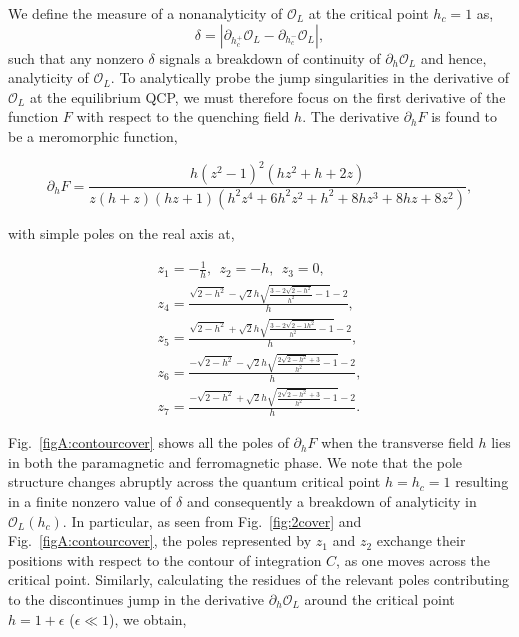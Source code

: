 \documentclass[aps,prx,twocolumn]{revtex4-2}
\begin{document}
{{ We define the measure of a nonanalyticity of $\mathcal{O}_L$ at the critical point $h_c=1$ as,
\begin{equation}\label{eq_a:delta}
	\delta=\left|\partial_{h_c^+}\mathcal{O}_L-\partial_{h_c^-}\mathcal{O}_L\right|,
\end{equation}
such that any nonzero $\delta$ signals a breakdown of continuity of $\partial_h\mathcal{O}_L$ and hence, analyticity of $\mathcal{O}_L$. To analytically probe  the jump singularities in the derivative of $\mathcal{O}_L$ at the equilibrium QCP, we must therefore focus on the first derivative of the function $F$ with respect to the quenching field $h$. The derivative $\partial_hF$ is found to be a meromorphic function,
\begin{widetext}
\begin{equation}
	\partial_hF=\frac{h \left(z^2-1\right)^2 \left(h z^2+h+2 z\right)}{z (h+z) (h z+1) \left(h^2 z^4+6 h^2 z^2+h^2+8 h z^3+8 h z+8 z^2\right)},
\end{equation}
\end{widetext}
with simple poles on the real axis at,
\pagebreak
\begin{widetext}
\begin{eqnarray}
\nonumber z_1=-\frac{1}{h},~~z_2=-h,~~z_3=0,\\
\nonumber z_4=\frac{\sqrt{2-h^2}-\sqrt{2} h \sqrt{\frac{3-2 \sqrt{2-h^2}}{h^2}-1}-2}{h},\\
\nonumber z_5=\frac{\sqrt{2-h^2}+\sqrt{2} h \sqrt{\frac{3-2 \sqrt{2-1 h^2}}{h^2}-1}-2}{h},\\
\nonumber z_6=\frac{-\sqrt{2-h^2}-\sqrt{2} h \sqrt{\frac{2 \sqrt{2-h^2}+3}{h^2}-1}-2}{h},\\
z_7=\frac{-\sqrt{2-h^2}+\sqrt{2} h \sqrt{\frac{2 \sqrt{2-h^2}+3}{h^2}-1}-2}{h}.
\end{eqnarray}
\end{widetext}
Fig.~\ref{figA:contourcover} shows all the poles of $\partial_hF$ when the transverse field $h$ lies in both the paramagnetic and ferromagnetic phase. We note that the pole structure changes abruptly across the quantum critical point $h=h_c=1$ resulting in a finite nonzero value of $\delta$ and consequently a breakdown of analyticity in $\mathcal{O}_L(h_c)$. In particular, as seen from Fig.~\ref{fig:2cover} and Fig.~\ref{figA:contourcover}, the poles represented by $z_1$ and $z_2$ exchange their positions with respect to the contour of integration $C$, as one moves across the critical point. Similarly, calculating the residues of the relevant poles contributing to the discontinues jump in the derivative $\partial_h\mathcal{O}_L$ around the critical point $h=1+\epsilon$ ($\epsilon\ll1$), we obtain,
}}
\end{document}
